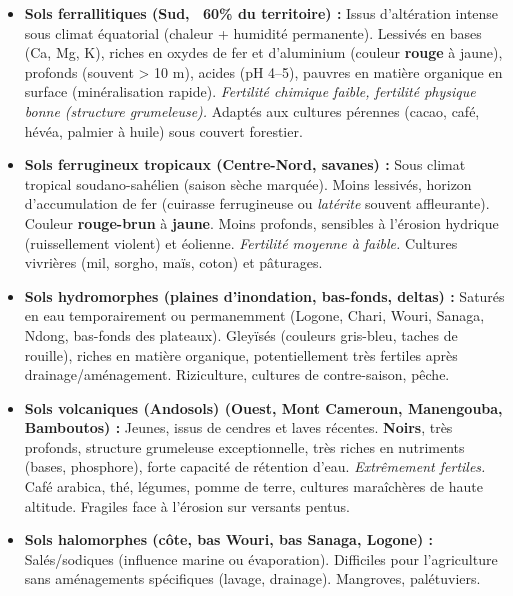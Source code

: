 \documentclass[11pt]{article}
\begin{document}
\begin{propriete}
\begin{itemize}
    \item \textbf{Sols ferrallitiques (Sud, ~60\% du territoire) :} Issus d'altération intense sous climat équatorial (chaleur + humidité permanente). Lessivés en bases (Ca, Mg, K), riches en oxydes de fer et d'aluminium (couleur \textbf{rouge} à jaune), profonds (souvent > 10 m), acides (pH 4--5), pauvres en matière organique en surface (minéralisation rapide). \emph{Fertilité chimique faible, fertilité physique bonne (structure grumeleuse).} Adaptés aux cultures pérennes (cacao, café, hévéa, palmier à huile) sous couvert forestier.
    \item \textbf{Sols ferrugineux tropicaux (Centre-Nord, savanes) :} Sous climat tropical soudano-sahélien (saison sèche marquée). Moins lessivés, horizon d'accumulation de fer (cuirasse ferrugineuse ou \emph{latérite} souvent affleurante). Couleur \textbf{rouge-brun} à \textbf{jaune}. Moins profonds, sensibles à l'érosion hydrique (ruissellement violent) et éolienne. \emph{Fertilité moyenne à faible.} Cultures vivrières (mil, sorgho, maïs, coton) et pâturages.
    \item \textbf{Sols hydromorphes (plaines d'inondation, bas-fonds, deltas) :} Saturés en eau temporairement ou permanemment (Logone, Chari, Wouri, Sanaga, Ndong, bas-fonds des plateaux). Gleyïsés (couleurs gris-bleu, taches de rouille), riches en matière organique, potentiellement très fertiles après drainage/aménagement. Riziculture, cultures de contre-saison, pêche.
    \item \textbf{Sols volcaniques (Andosols) (Ouest, Mont Cameroun, Manengouba, Bamboutos) :} Jeunes, issus de cendres et laves récentes. \textbf{Noirs}, très profonds, structure grumeleuse exceptionnelle, très riches en nutriments (bases, phosphore), forte capacité de rétention d'eau. \emph{Extrêmement fertiles.} Café arabica, thé, légumes, pomme de terre, cultures maraîchères de haute altitude. Fragiles face à l'érosion sur versants pentus.
    \item \textbf{Sols halomorphes (côte, bas Wouri, bas Sanaga, Logone) :} Salés/sodiques (influence marine ou évaporation). Difficiles pour l'agriculture sans aménagements spécifiques (lavage, drainage). Mangroves, palétuviers.
\end{itemize}
\end{propriete}
\end{document}
